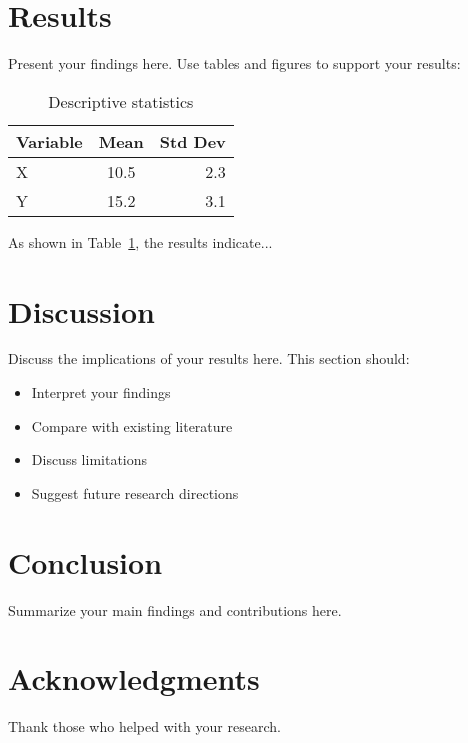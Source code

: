 \documentclass[11pt]{article}
\begin{document}
\section{Results}
Present your findings here. Use tables and figures to support your results:

\begin{table}[h]
\centering
\begin{tabular}{|l|c|r|}
\hline
Variable & Mean & Std Dev \\
\hline
X & 10.5 & 2.3 \\
Y & 15.2 & 3.1 \\
\hline
\end{tabular}
\caption{Descriptive statistics}
\label{tab:stats}
\end{table}

As shown in Table~\ref{tab:stats}, the results indicate...

\section{Discussion}
Discuss the implications of your results here. This section should:
\begin{itemize}
    \item Interpret your findings
    \item Compare with existing literature
    \item Discuss limitations
    \item Suggest future research directions
\end{itemize}

\section{Conclusion}
Summarize your main findings and contributions here.

\section*{Acknowledgments}
Thank those who helped with your research.



\end{document}
